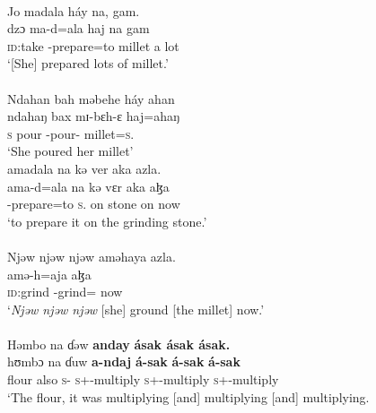 \ea \label{ex:8:30}\\
Jo  madala  háy  na,  gam.\\     
\gll  dzɔ ma-d=ala haj na gam\\
      {\textsc{id}:take}    {\NOM}-prepare=to    millet   {\PSP}   {a lot}\\
\glt  ‘[She] prepared lots of millet.’\\
\medskip
{}\\
Ndahan  bah  məbehe  háy  ahan \\
\gll  ndahaŋ bax mɪ{}-bɛh-ɛ haj=ahaŋ\\
      \textsc{s} pour {\NOM}{}-pour-{\CL}  millet=\textsc{s}.{\POSS} \\
\glt  ‘She poured her millet’\\
\medskip
amadala  na  kə  ver  aka  azla.\\
\gll   ama-d=ala na kə vɛr aka aɮa\\
      {\DEP}-prepare=to   \textsc{s}.{\DO}   on   stone  on      now\\
\glt  ‘to prepare it on the grinding stone.’\\

\medskip
{}\\
Njəw  njəw  njəw aməhaya  azla.\\  
 amə-h=aja aɮa\\
      {\textsc{id}:grind}     {\DEP}-grind={\PLU}    now\\
\glt  ‘\textit{Njəw  njəw  njəw} [she]  ground [the millet] now.’ \\

\medskip
{}\\
Həmbo  na  ɗəw  \textbf{anday}  \textbf{ásak  ásak  ásak.}\\
\gll  hʊmbɔ na ɗuw \textbf{a-ndaj} \textbf{á-sak}  \textbf{á-sak}  \textbf{á-sak}\\
      flour  {\PSP}  also  \textsc{s}-{\PRG} {\textsc{s}+{\IFV}-multiply} {\textsc{s}+{\IFV}-multiply} {\textsc{s}+{\IFV}-multiply}\\
\glt  ‘The flour, it was multiplying [and] multiplying [and] multiplying.\\

\medskip

